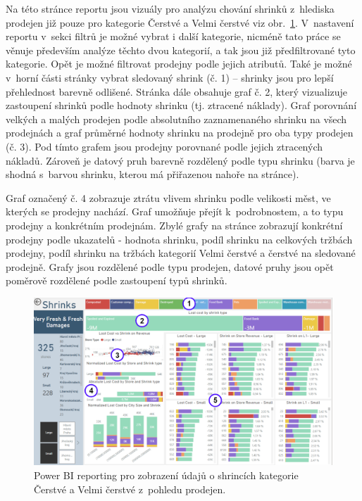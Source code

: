 Na této stránce reportu jsou vizuály pro analýzu chování shrinků z~hlediska prodejen již pouze pro kategorie Čerstvé a Velmi čerstvé viz obr.~\ref*{obr:PBI:storesSFF}. V~nastavení reportu v~sekci filtrů je možné vybrat i další kategorie, nicméně tato práce se věnuje především analýze těchto dvou kategorií, a tak jsou již předfiltrované tyto kategorie. Opět je možné filtrovat prodejny podle jejich atributů. Také je možné v~horní části stránky vybrat sledovaný shrink (č. 1) -- shrinky jsou pro lepší přehlednost barevně odlišené. 
Stránka dále obsahuje graf č. 2, který vizualizuje zastoupení shrinků podle hodnoty shrinku (tj. ztracené náklady). 
 Graf porovnání velkých a malých prodejen podle absolutního zaznamenaného shrinku na všech prodejnách a graf průměrné hodnoty shrinku na prodejně pro oba typy prodejen (č. 3). Pod tímto grafem jsou prodejny porovnané podle jejich ztracených nákladů. Zároveň je datový pruh barevně rozdělený podle typu shrinku (barva je shodná s~barvou shrinku, kterou má přiřazenou nahoře na stránce). 

Graf označený č. 4 zobrazuje ztrátu vlivem shrinku podle velikosti měst, ve kterých se prodejny nachází. Graf umožňuje přejít k~podrobnostem, a to typu prodejny a konkrétním prodejnám. Zbylé grafy na stránce zobrazují konkrétní prodejny podle ukazatelů - hodnota shrinku, podíl shrinku na celkových tržbách prodejny, podíl shrinku na tržbách kategorií Velmi čerstvé a čerstvé na sledované prodejně. Grafy jsou rozdělené podle typu prodejen, datové pruhy jsou opět poměrově rozdělené podle zastoupení typů shrinků.

\begin{figure}[h!]
    \centering
    \captionsetup{justification=centering}
    \includegraphics[width=\textwidth]{obrazky/PBI/storesSFF.png}
    \caption{Power BI reporting pro zobrazení údajů o shrincích kategorie \\ Čerstvé a Velmi čerstvé z~pohledu prodejen.}
    \label{obr:PBI:storesSFF}
\end{figure}

